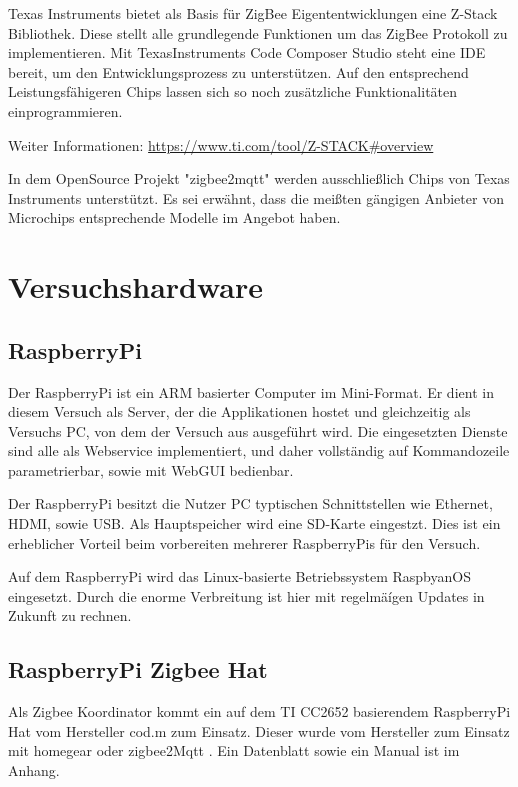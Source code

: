 Texas Instruments bietet als Basis für ZigBee Eigententwicklungen eine Z-Stack Bibliothek. Diese stellt alle grundlegende 
Funktionen um das ZigBee Protokoll zu implementieren. Mit TexasInstruments Code Composer Studio steht eine IDE bereit,
um den Entwicklungsprozess zu unterstützen. Auf den entsprechend Leistungsfähigeren Chips lassen sich so noch zusätzliche
Funktionalitäten einprogrammieren.

Weiter Informationen: \url{https://www.ti.com/tool/Z-STACK#overview}

In dem OpenSource Projekt "zigbee2mqtt" werden ausschließlich Chips von Texas Instruments unterstützt. Es sei erwähnt, 
dass die meißten gängigen Anbieter von Microchips entsprechende Modelle im Angebot haben. 

\section{Versuchshardware}

\subsection{RaspberryPi}

Der RaspberryPi ist ein ARM basierter Computer im Mini-Format. Er dient in diesem Versuch als Server, der die Applikationen
hostet und gleichzeitig als Versuchs PC, von dem der Versuch aus ausgeführt wird. Die eingesetzten Dienste sind alle
als Webservice implementiert, und daher vollständig auf Kommandozeile parametrierbar, sowie mit WebGUI bedienbar.

Der RaspberryPi besitzt die Nutzer PC typtischen Schnittstellen wie Ethernet, HDMI, sowie USB. Als Hauptspeicher wird eine
SD-Karte eingestzt. Dies ist ein erheblicher Vorteil beim vorbereiten mehrerer RaspberryPis für den Versuch.

Auf dem RaspberryPi wird das Linux-basierte Betriebssystem RaspbyanOS eingesetzt. Durch die enorme Verbreitung ist
hier mit regelmäígen Updates in Zukunft zu rechnen.

\subsection{RaspberryPi Zigbee Hat}

Als Zigbee Koordinator kommt ein auf dem TI CC2652 basierendem RaspberryPi Hat vom Hersteller \grqq cod.m \grqq{} zum Einsatz. Dieser wurde vom Hersteller
zum Einsatz mit \grqq homegear \grqq{} oder \grqq zigbee2Mqtt \grqq{}. Ein Datenblatt sowie ein Manual ist im Anhang.


